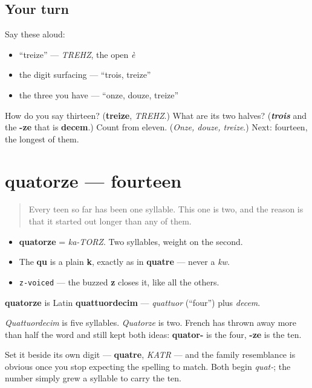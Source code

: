\subsection*{Your turn}
Say these aloud:

\begin{itemize}
\raggedright
  \item \textquotedblleft{}treize\textquotedblright{} — \emph{TREHZ}, the open \emph{è}
  \item the digit surfacing — \textquotedblleft{}trois, treize\textquotedblright{}
  \item the three you have — \textquotedblleft{}onze, douze, treize\textquotedblright{}
\end{itemize}

\begin{tcolorbox}[breakable,colback=teal!4,colframe=teal!35!black,title={Before you move on}]
How do you say thirteen? (\textbf{treize}, \emph{TREHZ}.) What are its two halves? (\emph{\textbf{trois}} and the \textbf{-ze} that is \textbf{decem}.) Count from eleven. (\emph{Onze, douze, treize}.) Next: fourteen, the longest of them.
\end{tcolorbox}
\section[quatorze]{quatorze — fourteen}

\label{lesson:FR-C12-quatorze}



\begin{quote}
Every teen so far has been one syllable. This one is two, and the reason is that it started out longer than any of them.
\end{quote}

\begin{sounds}
\begin{itemize}
\raggedright
  \item \textbf{quatorze} = \emph{ka-TORZ}. Two syllables, weight on the second.
  \item The \textbf{qu} is a plain \textbf{k}, exactly as in \textbf{quatre} — never a \emph{kw}.
  \item \texttt{z-voiced} — the buzzed \textbf{z} closes it, like all the others.
\end{itemize}
\end{sounds}

\begin{cousinweb}
\textbf{quatorze} is Latin \textbf{quattuordecim} — \emph{quattuor} (\textquotedblleft{}four\textquotedblright{}) plus \emph{decem}.

\emph{Quattuordecim} is five syllables. \emph{Quatorze} is two. French has thrown away more than half the word and still kept both ideas: \textbf{quator-} is the four, \textbf{-ze} is the ten.

Set it beside its own digit — \textbf{quatre}, \emph{KATR} — and the family resemblance is obvious once you stop expecting the spelling to match. Both begin \emph{quat-}; the number simply grew a syllable to carry the ten.
\end{cousinweb}

